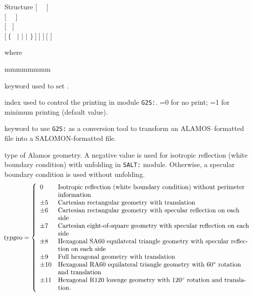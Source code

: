 \vskip -0.5cm

\begin{DataStructure}{Structure }
$[$~ ~$]$ \\
$[$~ ~$]$ \\
$[$~ $]$ \\
$[~\{$~ $|$  $|$  $|$  $\}~]~[$   
$]~[$    $]$ \\
\moc{;}
\end{DataStructure}

\vskip -0.3cm

\noindent where
\begin{ListeDeDescription}{mmmmmmmm}

\item[\moc{EDIT}] keyword used to set .

\item[\dusa{iprint}] index used to control the printing in module {\tt G2S:}. =0 for no print; =1 for minimum printing (default value).

\item[\moc{ALAMOS}] keyword to use {\tt G2S:} as a conversion tool to transform an ALAMOS--formatted file into
a SALOMON-formatted file.

\item[\dusa{typgeo}] type of Alamos geometry. A negative value is used for isotropic reflection (white boundary condition) with unfolding in {\tt SALT:} module.
Otherwise, a specular boundary condition is used without unfolding.
\begin{displaymath}
\negthinspace \textsl{typgeo} = \left\{
\begin{array}{ll}
0 & \textrm{Isotropic reflection (white boundary condition) without perimeter}\\
& \textrm{information}\\
\pm 5 & \textrm{Cartesian rectangular geometry with translation}\\
\pm 6 & \textrm{Cartesian rectangular geometry with specular reflection on each}\\
& \textrm{side}\\
\pm 7 & \textrm{Cartesian eight-of-square geometry with specular reflection on each}\\
& \textrm{side}\\
\pm 8 & \textrm{Hexagonal SA60 equilateral triangle geometry with specular reflec-}\\
& \textrm{tion on each side}\\
\pm 9 & \textrm{Full hexagonal geometry with translation}\\
\pm 10 & \textrm{Hexagonal RA60 equilateral triangle geometry with } 60^\circ \textrm{ rotation}\\
& \textrm{and translation}\\
\pm 11 & \textrm{Hexagonal R120 lozenge geometry with } 120^\circ \textrm{ rotation and transla-}\\
& \textrm{tion.}
\end{array} \right.
\end{displaymath}


\end{ListeDeDescription}
